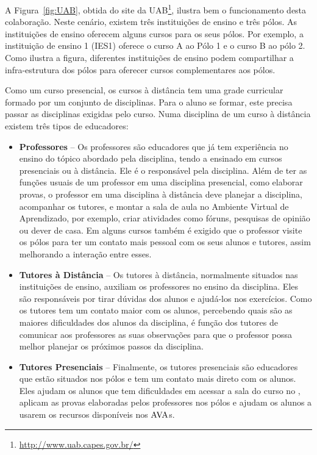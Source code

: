 A Figura~\ref{fig:UAB}, obtida do site da UAB\footnote{\url{http://www.uab.capes.gov.br/}}, 
ilustra bem o funcionamento desta colaboração. Neste cenário, existem três instituições
de ensino e três pólos. As instituições de ensino oferecem alguns cursos para os seus 
pólos. Por exemplo, a instituição de ensino 1 (IES1) oferece o curso A ao Pólo 1 e 
o curso B ao pólo 2. Como ilustra a figura, diferentes instituições de ensino podem
compartilhar a infra-estrutura dos pólos para oferecer cursos complementares aos pólos.

Como um curso presencial, os cursos à distância tem uma grade curricular formado 
por um conjunto de disciplinas. Para o aluno se formar, este precisa passar as disciplinas
exigidas pelo curso. Numa disciplina de um curso à distância existem três tipos de educadores:
\begin{itemize}
 \item \textbf{Professores} -- Os professores são educadores que já tem experiência no ensino do tópico 
 abordado pela disciplina, tendo a ensinado em cursos presenciais ou à distância. Ele é o responsável 
 pela disciplina. Além de ter as funções usuais de um professor em uma disciplina presencial, como 
 elaborar provas, 
 o professor em uma disciplina à distância deve planejar a disciplina, acompanhar os tutores, e montar a sala de aula 
 no Ambiente Virtual de Aprendizado, por exemplo, criar atividades como fóruns,  pesquisas de opinião ou dever de casa.
 Em alguns cursos também é exigido que o professor visite os pólos para ter um contato mais pessoal 
 com os seus alunos e tutores, assim melhorando a interação entre esses. 
 
 \item \textbf{Tutores à Distância} -- Os tutores à distância, normalmente situados nas instituições de ensino, 
 auxiliam os professores no ensino da disciplina. Eles são responsáveis por tirar dúvidas dos alunos e ajudá-los 
 nos exercícios. Como os tutores tem um contato maior com os alunos, percebendo quais são as maiores 
 dificuldades dos alunos da disciplina, é função dos tutores de comunicar aos professores as suas observações para
 que o professor possa melhor planejar os próximos passos da disciplina. 
 
 
 \item \textbf{Tutores Presenciais} -- Finalmente, os tutores presenciais são educadores que estão situados nos pólos
 e tem um contato mais direto com os alunos. Eles ajudam os alunos que tem dificuldades em acessar a sala do curso no 
 \ava, aplicam as provas elaboradas pelos professores nos pólos e 
 ajudam os alunos a usarem os recursos disponíveis nos $\hbox{AVA}$s. 
\end{itemize}

